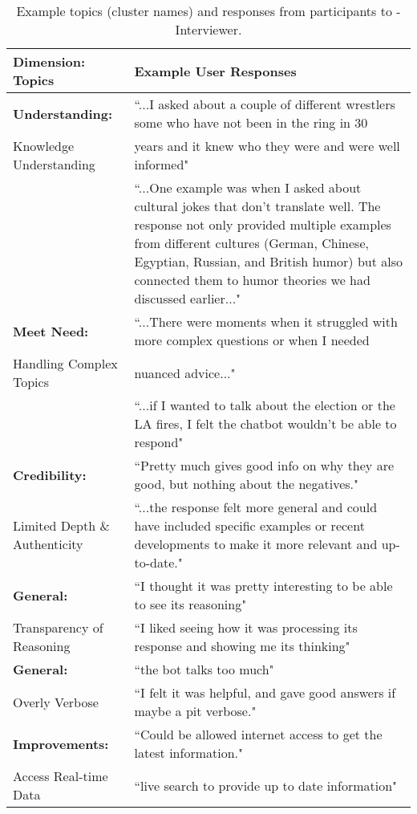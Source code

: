 \begin{table*}[t]
    \centering
    \small
    \caption{Example topics (cluster names) and responses from participants to \method-Interviewer.} \label{tab:case_study}
    \begin{tabular}{l|p{11.3cm}} \toprule
      \textbf{Dimension: Topics}   &  
      \textbf{Example User Responses} \\ \hline
\textbf{Understanding:} & ``...I asked about a couple of different wrestlers some who have not been in the ring in 30 \\
Knowledge Understanding & years and it knew who they were and were well informed"\\
 & ``...One example was when I asked about cultural jokes that don’t translate well. The response not only provided multiple examples from different cultures (German, Chinese, Egyptian, Russian, and British humor) but also connected them to humor theories we had discussed earlier..."\\ \hline
\textbf{Meet Need:} & ``...There were moments when it struggled with more complex questions or when I needed \\
Handling Complex Topics & nuanced advice..." \\
& ``...if I wanted to talk about the election or the LA fires, I felt the chatbot wouldn't be able to respond"  \\  \hline
\textbf{Credibility:} &   ``Pretty much gives good info on why they are good, but nothing about the negatives." \\
Limited Depth \& Authenticity& ``...the response felt more general and could have included specific examples or recent developments to make it more relevant and up-to-date."\\  \hline
\textbf{General:} & ``I thought it was pretty interesting to be able to see its reasoning" \\
Transparency of Reasoning & ``I liked seeing how it was processing its response and showing me its thinking" \\  \hline
\textbf{General:} & ``the bot talks too much" \\
Overly Verbose & ``I felt it was helpful, and gave good answers if maybe a pit verbose." \\   \hline     
\textbf{Improvements:}& ``Could be allowed internet access to get the latest information."\\  
Access Real-time Data  & ``live search to provide up to date information" \\ \hline

\end{tabular}
\end{table*}
